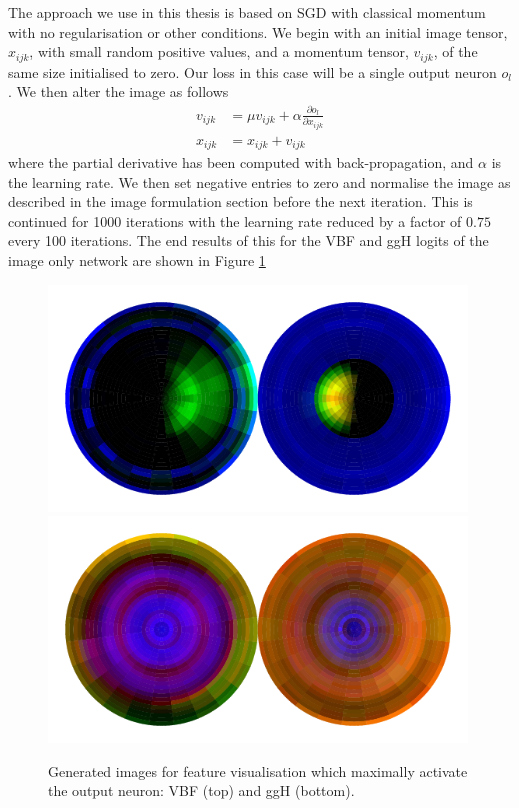 The approach we use in this thesis is based on SGD with classical momentum with no regularisation or other conditions. 
We begin with an initial image tensor, $x_{ijk}$, with small random positive values, and a momentum tensor, $v_{ijk}$, of the same size initialised to zero.
Our loss in this case will be a single output neuron $o_{l}$. We then alter the image as follows
\begin{equation}
    \begin{split}
        v_{ijk} &= \mu{}v_{ijk} + \alpha\frac{\partial{o_{l}}}{\partial{x_{ijk}}} \\
        x_{ijk} &= x_{ijk} + v_{ijk}
    \end{split}
\end{equation} 
where the partial derivative has been computed with back-propagation, and $\alpha$ is the learning rate. We then set negative entries to zero and normalise the image as described in the image formulation section before the next iteration. This is continued for 1000 iterations with the learning rate reduced by a factor of $0.75$ every 100 iterations. 
The end results of this for the VBF and ggH logits of the image only network are shown in Figure \ref{fig:event_categorisation:feature_vis_vbf_ggh}
\begin{figure}[h!]
    \centering
    \includegraphics[width=0.99\textwidth]{figures/event_selection/norm_logits1.pdf}
    \includegraphics[width=0.99\textwidth]{figures/event_selection/norm_logits0.pdf}
    \caption{Generated images for feature visualisation which maximally activate the output neuron: VBF (top) and ggH (bottom).}
    \label{fig:event_categorisation:feature_vis_vbf_ggh}
\end{figure}

